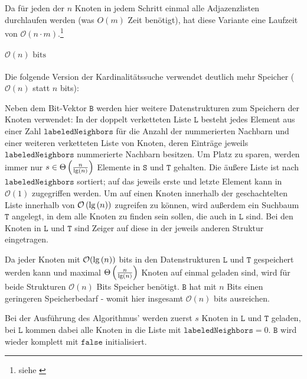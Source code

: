 Da für jeden der \( n \) Knoten in jedem Schritt einmal alle Adjazenzlisten durchlaufen werden (was \(O\left( m\right)\) Zeit benötigt), hat diese Variante eine Laufzeit von \( \mathcal{O} \left( n \cdot m \right) \).\footnote{siehe \cite[Abschnitt 3.1]{sankardeep}}

\paragraph{\( \mathcal{O} \left( n \right) \text{ bits} \)} Die folgende Version der Kardinalitätssuche verwendet deutlich mehr Speicher (\( \mathcal{O} \left( n \right) \) statt \( n \) bits):

Neben dem Bit-Vektor \( \texttt{B} \)  werden hier weitere Datenstrukturen zum Speichern der Knoten verwendet: In der doppelt verketteten Liste \( \texttt{L} \) besteht jedes Element aus einer Zahl \( \texttt{labeledNeighbors} \) für die Anzahl der nummerierten Nachbarn und einer weiteren verketteten Liste von Knoten, deren Einträge jeweils \( \texttt{labeledNeighbors} \) nummerierte Nachbarn besitzen. Um Platz zu sparen, werden immer nur \( s \in \Theta \left( \frac{n}{\textnormal{lg}\left( n \right)}\right) \) Elemente in \( \texttt{S} \) und \( \texttt{T} \) gehalten. Die äußere Liste ist nach \( \texttt{labeledNeighbors} \) sortiert; auf das jeweils erste und letzte Element kann in \( \mathcal{O} \left( 1 \right) \) zugegriffen werden. Um auf einen Knoten innerhalb der geschachtelten Liste innerhalb von \( \mathcal{O} \left( \textnormal{lg} \left( n  \right) \right) \) zugreifen zu können, wird außerdem ein Suchbaum \( \texttt{T} \)  angelegt, in dem alle Knoten zu finden sein sollen, die auch in \( \texttt{L} \) sind. Bei den Knoten in \( \texttt{L} \) und \( \texttt{T} \) sind Zeiger auf diese in der jeweils anderen Struktur eingetragen.

Da jeder Knoten mit \( \mathcal{O} (\textnormal{lg}\left( n \right)) \) bits in den Datenstrukturen \( \texttt{L} \) und \( \texttt{T} \) gespeichert werden kann und maximal \( \Theta \left(\frac{n}{\textnormal{lg}\left( n \right)} \right) \) Knoten auf einmal geladen sind, wird für beide Strukturen \( \mathcal{O} \left( n \right) \) Bits Speicher benötigt. \( \texttt{B} \) hat mit \( n \) Bits einen geringeren Speicherbedarf - womit hier insgesamt \( \mathcal{O} \left( n \right) \) bits ausreichen.

Bei der Ausführung des Algorithmus' werden zuerst \( s \) Knoten in \( \texttt{L} \) und \( \texttt{T} \) geladen, bei \( \texttt{L} \) kommen dabei alle Knoten in die Liste mit \( \texttt{labeledNeighbors} = 0 \). \( \texttt{B} \) wird wieder komplett mit \( \texttt{false} \) initialisiert.

